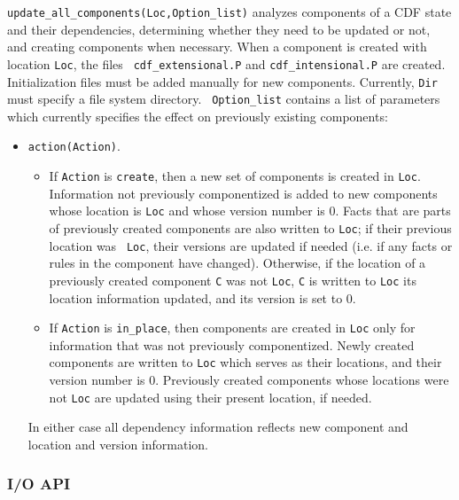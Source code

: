 \begin{description}
{\tt update\_all\_components(Loc,Option\_list)} analyzes components of
a CDF state and their dependencies, determining whether they need to
be updated or not, and creating components when necessary.  When a
component is created with location {\tt Loc}, the files {\tt
cdf\_extensional.P} and {\tt cdf\_intensional.P} are created.
Initialization files must be added manually for new components.
Currently, {\tt Dir} must specify a file system directory. {\tt
Option\_list} contains a list of parameters which currently specifies
the effect on previously existing components:

\begin{itemize} 
\item {\tt action(Action)}.  
\begin{itemize} 

\item If {\tt Action} is {\tt create}, then a new set of components is
created in {\tt Loc}.  Information not previously componentized is
added to new components whose location is {\tt Loc} and whose version
number is 0.  Facts that are parts of previously created components
are also written to {\tt Loc}; if their previous location was {\tt
Loc}, their versions are updated if needed (i.e. if any facts or rules
in the component have changed).  Otherwise, if the location of a
previously created component {\tt C} was not {\tt Loc}, {\tt C} is
written to {\tt Loc} its location information updated, and its version
is set to 0.  

\item If {\tt Action} is {\tt in\_place}, then components are created in
{\tt Loc} only for information that was not previously componentized.
Newly created components are written to {\tt Loc} which serves as
their locations, and their version number is 0.  Previously created
components whose locations were not {\tt Loc} are updated using their
present location, if needed.

\end{itemize}
In either case all dependency information reflects new component and
location and version information.
\end{itemize}

\end{description}

\subsubsection{I/O API}

